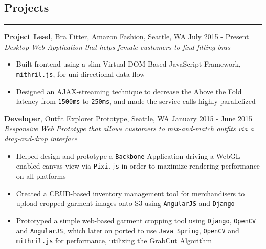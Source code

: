 \documentclass[line]{res} %
\begin{document}
\begin{resume}
  \section{Projects}
  \rule{\textwidth}{1pt}
    \textbf{Project Lead}, Bra Fitter, Amazon Fashion, Seattle, WA
    \hfill July 2015 - Present \\
    \textit{Desktop Web Application that helps female customers to find fitting bras}
    \begin{itemize} \itemsep -2pt  %
      \item Built frontend using a slim Virtual-DOM-Based JavaScript Framework,
            \texttt{mithril.js}, for uni-directional data flow
      \item Designed an AJAX-streaming technique to decrease the Above the Fold latency from \texttt{1500ms} to
            \texttt{250ms}, and made the service calls highly parallelized
		\end{itemize}

    \textbf{Developer}, Outfit Explorer Prototype, Seattle, WA
    \hfill January 2015 - June 2015 \\
    \textit{Responsive Web Prototype that allows customers to mix-and-match outfits
            via a drag-and-drop interface}
    \begin{itemize} \itemsep -2pt  %
      \item Helped design and prototype a \texttt{Backbone} Application driving a WebGL-enabled canvas view via
            \texttt{Pixi.js} in order to maximize rendering performance on all platforms
      \item Created a CRUD-based inventory management tool for merchandisers to upload cropped garment images onto S3
            using \texttt{AngularJS} and \texttt{Django}
      \item Prototyped a simple web-based garment cropping tool using \texttt{Django}, \texttt{OpenCV} and
            \texttt{AngularJS}, which later on ported to use \texttt{Java Spring}, \texttt{OpenCV} and
            \texttt{mithril.js} for performance, utilizing the GrabCut Algorithm
    \end{itemize}


\end{resume}
\end{document}
